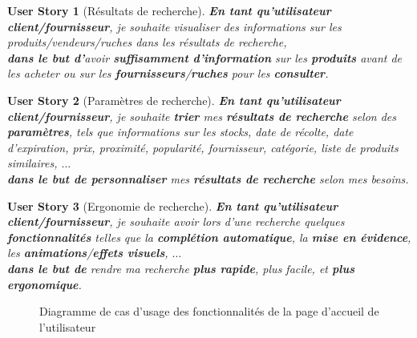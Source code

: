 \documentclass[a4paper,12pt]{book}
\theoremstyle{break}
\newtheorem*{userStory}{User Story}
\theoremstyle{break}
\theoremstyle{break}
\theoremstyle{break}
\theoremstyle{definition}
\theoremstyle{remark}
\begin{document}
\begin{userStory}[Résultats de recherche]
\textbf{En tant qu'utilisateur {\color{green}client}/{\color{red}fournisseur}}, je souhaite visualiser des informations sur les produits/vendeurs/ruches dans les résultats de recherche,\\
\indent
\textbf{dans le but d'}avoir \textbf{suffisamment d'information} sur les \textbf{produits} avant de les acheter ou sur les \textbf{fournisseurs}/\textbf{ruches} pour les \textbf{consulter}.
\end{userStory}

\begin{userStory}[Paramètres de recherche]
\textbf{En tant qu'utilisateur {\color{green}client}/{\color{red}fournisseur}}, je souhaite \textbf{trier} mes \textbf{résultats de recherche} selon des \textbf{paramètres}, tels que informations sur les stocks, date de récolte, date d'expiration, prix, proximité, popularité, fournisseur, catégorie, liste de produits similaires, $\dots$\\
\indent
\textbf{dans le but de personnaliser} mes \textbf{résultats de recherche} selon mes besoins.
\end{userStory}

\begin{userStory}[Ergonomie de recherche]
\textbf{En tant qu'utilisateur {\color{green}client}/{\color{red}fournisseur}}, je souhaite avoir lors d'une recherche quelques \textbf{fonctionnalités} telles que la \textbf{complétion automatique}, la \textbf{mise en évidence}, les \textbf{animations}/\textbf{effets visuels}, $\dots$\\
\indent
\textbf{dans le but de} rendre ma recherche \textbf{plus rapide}, plus facile, et \textbf{plus ergonomique}.
\end{userStory}

\begin{figure}[!ht]
  \centering
  \caption{Diagramme de cas d'usage des fonctionnalités de la page d'accueil de l'utilisateur}
  \label{fig:home_page_use_case_diagram}
\end{figure}
\end{document}
